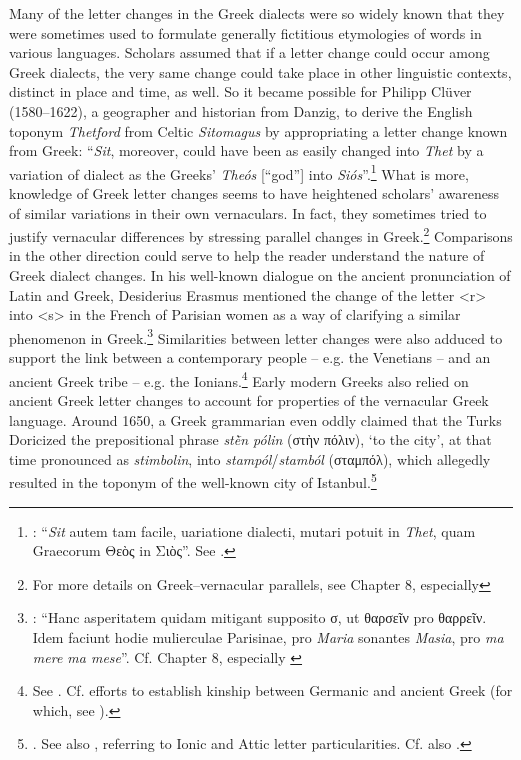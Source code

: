 Many of the letter changes in the Greek dialects were so widely known that they were sometimes used to formulate generally fictitious etymologies of words in various languages. Scholars assumed that if a letter change could occur among Greek dialects, the very same change could take place in other linguistic contexts, distinct in place and time, as well. So it became possible for Philipp Clüver (1580–1622), a geographer and historian from Danzig, to derive the English toponym \textit{Thetford} from Celtic \textit{Sitomagus} by appropriating a letter change known from Greek: “\textit{Sit}, moreover, could have been as easily changed into \textit{Thet} by a variation of dialect as the Greeks’ \textit{Theós} [“god”] into \textit{Siós}”.\footnote{{\citet[64]{Cluver1616}: “}{\textit{Sit}} {autem tam facile, uariatione dialecti, mutari potuit in} {\textit{Thet}}{, quam Graecorum Θεὸς in Σιὸς”. See \citet[114-115]{Metcalf2013}.}} What is more, knowledge of Greek letter changes seems to have heightened scholars’ awareness of similar variations in their own vernaculars. In fact, they sometimes tried to justify vernacular differences by stressing parallel changes in Greek.\footnote{{For more details on Greek–vernacular parallels, see Chapter 8, especially }} Comparisons in the other direction could serve to help the reader understand the nature of Greek dialect changes. In his well-known dialogue on the ancient pronunciation of Latin and Greek, Desiderius Erasmus mentioned the change of the letter <r> into <s> in the French of Parisian women as a way of clarifying a similar phenomenon in Greek.\footnote{{\citet[52]{Erasmus1528}: “Hanc asperitatem quidam mitigant supposito σ, ut θαρσεῖν pro θαρρεῖν. Idem faciunt hodie mulierculae Parisinae, pro} {\textit{Maria}} {sonantes} {\textit{Masia}}{, pro} {\textit{ma mere ma mese}}{”. Cf. Chapter 8, especially }} Similarities between letter changes were also adduced to support the link between a contemporary people – e.g. the Venetians – and an ancient Greek tribe – e.g. the Ionians.\footnote{{See \citet[97{\textsc{\textsuperscript{r}}}]{Da1509}. Cf. \citet[e.g., 122, 125, 126–127]{Reitz1730} efforts to establish kinship between Germanic and ancient Greek (for which, see \citealt{VanHal2016}).}} Early modern Greeks also relied on ancient Greek letter changes to account for properties of the vernacular Greek language. Around 1650, a Greek grammarian even oddly claimed that the Turks Doricized the prepositional phrase \textit{stḕn pólin} (στὴν πόλιν), ‘to the city’, at that time pronounced as \textit{stimbolin}, into \textit{stampól}/\textit{stamból} (σταμπόλ), which allegedly resulted in the toponym of the well-known city of Istanbul.\footnote{{\citet[14]{Nikiforos1908}. See also \citet[35]{Nikiforos1908}, referring to Ionic and Attic letter particularities. Cf.} also \citet[\textsc{a.4}\textsc{\textsuperscript{r}}]{Rodigast1685}.}

